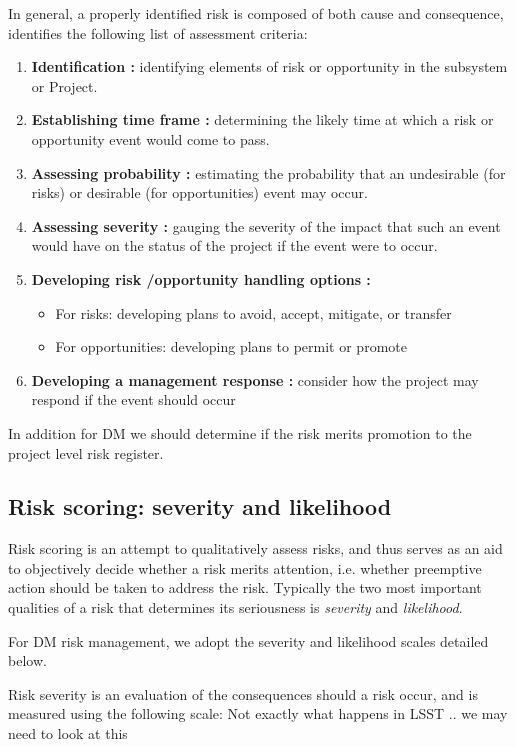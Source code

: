 In general, a properly identified risk is composed of both cause and consequence,  identifies the following list of assessment criteria:
\begin{enumerate}
\item {\bf Identification : }
identifying elements of risk or opportunity in the subsystem or Project.
\item {\bf Establishing  time  frame :}
    determining  the  likely  time at  which a  risk or  opportunity event would come to pass.
\item {\bf Assessing  probability :  }
  estimating  the  probability  that  an  undesirable (for  risks)  or desirable (for opportunities) event may occur.
\item {\bf Assessing  severity :}
   gauging  the  severity  of  the  impact  that  such  an  event  would  have on the status of the project if the event were to occur.
\item {\bf Developing risk /opportunity handling options :}
\begin{itemize}
\item  For  risks: developing  plans to  avoid, accept, mitigate, or transfer
\item  For opportunities: developing plans to permit or promote
\end{itemize}

\item {\bf Developing  a  management  response : }
 consider  how  the  project  may  respond  if  the event should occur
\end{enumerate}

In addition for DM we should determine if the risk merits promotion to the project level risk register.

\subsection{Risk scoring: severity and likelihood \label{sect:scoring}}

Risk scoring is an attempt to qualitatively assess risks, and thus serves as an aid to objectively decide whether a risk merits attention, i.e. whether preemptive action should be taken to address the risk. Typically the two most important qualities of a risk that determines its seriousness is {\em severity} and {\em likelihood}.

For DM risk management, we adopt the severity and likelihood scales detailed below.

Risk severity is an evaluation of the consequences should a risk occur, and is measured using the following scale:
{\color{red} Not exactly what happens in LSST .. we may need to look at this}

